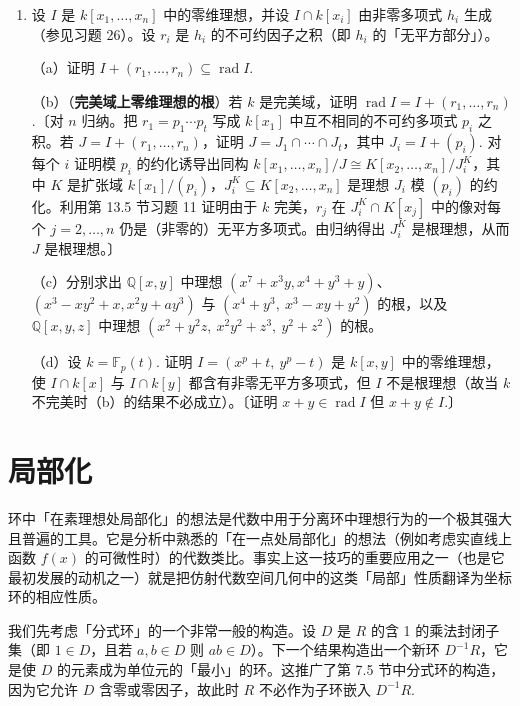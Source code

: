 \begin{enumerate}
（b）证明 \(|Z_{\bar k}(I)| \leq \dim_kk[x_1, \ldots, x_n]/I\).〔一种途径：利用第 1 节习题 43，并注意 \(\dim_{\bar k}\bar k[x_1, \ldots, x_n]/\operatorname{rad}I' \leq \dim_{\bar k}\bar k[x_1, \ldots, x_n]/I'\).〕

\item 设 \(I\) 是 \(k[x_1, \ldots, x_n]\) 中的零维理想，并设 \(I \cap k[x_i]\) 由非零多项式 \(h_i\) 生成（参见习题 26）。设 \(r_i\) 是 \(h_i\) 的不可约因子之积（即 \(h_i\) 的「无平方部分」）。

（a）证明 \(I+(r_1, \ldots, r_n) \subseteq \operatorname{rad}I\).

（b）（\textbf{完美域上零维理想的根}）若 \(k\) 是完美域，证明 \(\operatorname{rad}I = I+(r_1, \ldots, r_n)\).〔对 \(n\) 归纳。把 \(r_1 = p_1\cdots p_t\) 写成 \(k[x_1]\) 中互不相同的不可约多项式 \(p_i\) 之积。若 \(J = I+(r_1, \ldots, r_n)\)，证明 \(J = J_1 \cap \cdots \cap J_t\)，其中 \(J_i = I+(p_i)\). 对每个 \(i\) 证明模 \(p_i\) 的约化诱导出同构 \(k[x_1, \ldots, x_n]/J \cong K[x_2, \ldots, x_n]/J^K_i\)，其中 \(K\) 是扩张域 \(k[x_1]/(p_i)\)，\(J^K_i \subseteq K[x_2, \ldots, x_n]\) 是理想 \(J_i\) 模 \((p_i)\) 的约化。利用第 13.5 节习题 11 证明由于 \(k\) 完美，\(r_j\) 在 \(J^K_i \cap K[x_j]\) 中的像对每个 \(j = 2, \ldots, n\) 仍是（非零的）无平方多项式。由归纳得出 \(J^K_i\) 是根理想，从而 \(J\) 是根理想。〕

（c）分别求出 \(\mathbb{Q}[x,y]\) 中理想 \((x^7+x^3y, x^4+y^3+y)\)、\((x^3-xy^2+x, x^2y+ay^3)\) 与 \((x^4+y^3,\ x^3-xy+y^2)\) 的根，以及 \(\mathbb{Q}[x,y,z]\) 中理想 \((x^2+y^2z,\ x^2y^2+z^3,\ y^2+z^2)\) 的根。

（d）设 \(k = \mathbb{F}_p(t)\). 证明 \(I = (x^p+t,\ y^p-t)\) 是 \(k[x,y]\) 中的零维理想，使 \(I \cap k[x]\) 与 \(I \cap k[y]\) 都含有非零无平方多项式，但 \(I\) 不是根理想（故当 \(k\) 不完美时（b）的结果不必成立）。〔证明 \(x+y \in \operatorname{rad}I\) 但 \(x+y \notin I\).〕
\end{enumerate}

\section{局部化}

环中「在素理想处局部化」的想法是代数中用于分离环中理想行为的一个极其强大且普遍的工具。它是分析中熟悉的「在一点处局部化」的想法（例如考虑实直线上函数 \(f(x)\) 的可微性时）的代数类比。事实上这一技巧的重要应用之一（也是它最初发展的动机之一）就是把仿射代数空间几何中的这类「局部」性质翻译为坐标环的相应性质。

我们先考虑「分式环」的一个非常一般的构造。设 \(D\) 是 \(R\) 的含 1 的乘法封闭子集（即 \(1 \in D\)，且若 \(a, b \in D\) 则 \(ab \in D\)）。下一个结果构造出一个新环 \(D^{-1}R\)，它是使 \(D\) 的元素成为单位元的「最小」的环。这推广了第 7.5 节中分式环的构造，因为它允许 \(D\) 含零或零因子，故此时 \(R\) 不必作为子环嵌入 \(D^{-1}R\).

